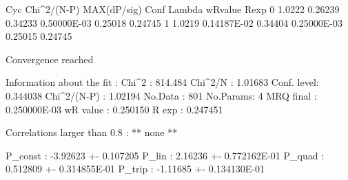 \begin{MacVerbatim}
Cyc Chi^2/(N-P)   MAX(dP/sig)   Conf          Lambda       wRvalue      Rexp
  0   1.0222      0.26239      0.34233      0.50000E-03  0.25018      0.24745    
  1   1.0219      0.14187E-02  0.34404      0.25000E-03  0.25015      0.24745    

Convergence reached 

 Information about the fit : 
   Chi^2      :  814.484          Chi^2/N :  1.01683    
   Conf. level: 0.344038      Chi^2/(N-P) :  1.02194    
   No.Data    :          801     No.Params:            4
   MRQ final  : 0.250000E-03
   wR value   : 0.250150          R exp   : 0.247451    

 Correlations larger than 0.8 :
   ** none **
  
   P_const          :   -3.92623      +-    0.107205    
   P_lin            :    2.16236      +-    0.772162E-01
   P_quad           :   0.512809      +-    0.314855E-01
   P_trip           :   -1.11685      +-    0.134130E-01
\end{MacVerbatim}

